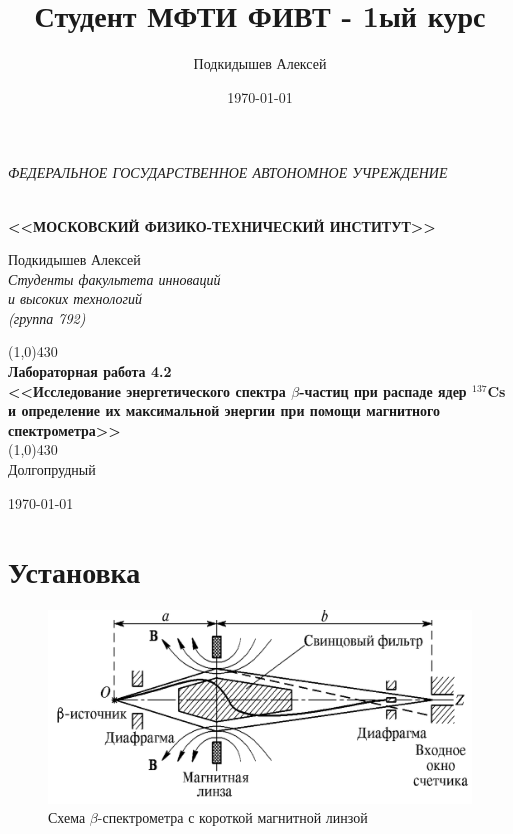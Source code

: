 \documentclass[a4paper,12pt]{article}
\author{Подкидышев Алексей}
\title{Студент МФТИ ФИВТ - 1ый курс}
\date{\today}
\theoremstyle{plain} %
\theoremstyle{definition} %
\theoremstyle{remark} %
\begin{document}

\begin{center}
	\textit{\MakeTextUppercase{федеральное государственное автономное учреждение}}
		
	\vspace{0.5ex}
	
	\textbf{ \\ \MakeTextUppercase{<<Московский Физико-технический институт>>}}
\end{center}
\vspace{13ex}
\begin{flushright}
	\noindent
	{Подкидышев Алексей}
	\\
	\textit{Студенты факультета инноваций\\ и высоких технологий\\(группа 792)}
\end{flushright}
\begin{center}
	\vspace{23ex}
	\line(1,0){430}\\[4ex]
	{\LARGE\textbf{Лабораторная работа 4.2}}
	\vspace{2ex}\\
	\textbf{\large{<<Исследование энергетического спектра $\beta$-частиц при распаде ядер $^{137}$Cs и определение их максимальной энергии при помощи магнитного спектрометра>>}}\\[3ex]
	\line(1,0){430}\\[5ex]
	\vfill
	Долгопрудный 
	
	{\today}
\end{center}

\newpage
\section*{Установка}

\begin{figure}[h!]
	\begin{center}
		\includegraphics[scale = 0.55]{schem}
		\caption{Схема $\beta$-спектрометра с короткой магнитной линзой}
		\label{ris:schem}
	\end{center}	
\end{figure}
\end{document}
